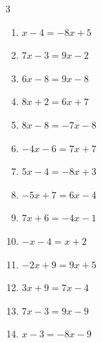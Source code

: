 \begin{multicols}{3}
\begin{enumerate}

  \item $x-4=-8x+5$

        \phantom{$\displaystyle x=1$}

  \item $7x-3=9x-2$


  \item $6x-8=9x-8$

        \phantom{$\displaystyle x=0$}

  \item $8x+2=6x+7$


  \item $8x-8=-7x-8$

        \phantom{$\displaystyle x=0$}

  \item $-4x-6=7x+7$


  \item $5x-4=-8x+3$


\columnbreak %

  \item $-5x+7=6x-4$

        \phantom{$\displaystyle x=1$}

  \item $7x+6=-4x-1$


  \item $-x-4=x+2$

        \phantom{$\displaystyle x=-3$}

  \item $-2x+9=9x+5$


  \item $3x+9=7x-4$


  \item $7x-3=9x-9$

        \phantom{$\displaystyle x=3$}

  \item $x-3=-8x-9$


\end{enumerate}
\end{multicols}
